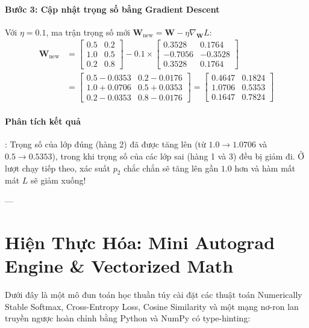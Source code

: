 \begin{example}
\paragraph{Bước 3: Cập nhật trọng số bằng Gradient Descent}
Với $\eta = 0.1$, ma trận trọng số mới $\mathbf{W}_{\text{new}} = \mathbf{W} - \eta \nabla_\mathbf{W} L$:
\begin{align*}
\mathbf{W}_{\text{new}} &= \begin{bmatrix} 0.5 & 0.2 \\ 1.0 & 0.5 \\ 0.2 & 0.8 \end{bmatrix} - 0.1 \times \begin{bmatrix} 0.3528 & 0.1764 \\ -0.7056 & -0.3528 \\ 0.3528 & 0.1764 \end{bmatrix} \\
&= \begin{bmatrix} 0.5 - 0.0353 & 0.2 - 0.0176 \\ 1.0 + 0.0706 & 0.5 + 0.0353 \\ 0.2 - 0.0353 & 0.8 - 0.0176 \end{bmatrix} = \begin{bmatrix} 0.4647 & 0.1824 \\ 1.0706 & 0.5353 \\ 0.1647 & 0.7824 \end{bmatrix}
\end{align*}

\paragraph{Phân tích kết quả}: Trọng số của lớp đúng (hàng 2) đã được tăng lên (từ $1.0 \to 1.0706$ và $0.5 \to 0.5353$), trong khi trọng số của các lớp sai (hàng 1 và 3) đều bị giảm đi. Ở lượt chạy tiếp theo, xác suất $p_2$ chắc chắn sẽ tăng lên gần $1.0$ hơn và hàm mất mát $L$ sẽ giảm xuống!
\end{example}

---

\section{Hiện Thực Hóa: Mini Autograd Engine \& Vectorized Math}
\label{sec:ch04-implementation}

Dưới đây là một mô đun toán học thuần túy cài đặt các thuật toán Numerically Stable Softmax, Cross-Entropy Loss, Cosine Similarity và một mạng nơ-ron lan truyền ngược hoàn chỉnh bằng Python và NumPy có type-hinting:

